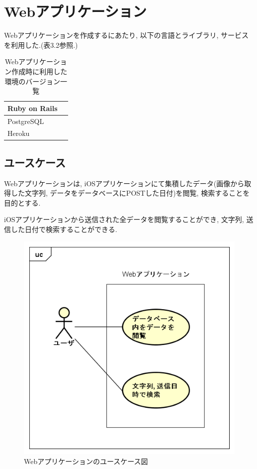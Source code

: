 \section{Webアプリケーション}
Webアプリケーションを作成するにあたり, 以下の言語とライブラリ, サービスを利用した.(表3.2参照.)

\begin{table}
\begin{center}
\begin{tabular}{|l|l|} \hline
Ruby on Rails & \\ \hline
PostgreSQL & \\ \hline
Heroku & \\ \hline
\end{tabular}
\end{center}
\caption{Webアプリケーション作成時に利用した環境のバージョン一覧}
\end{table}

\subsection{ユースケース}
Webアプリケーションは, iOSアプリケーションにて集積したデータ(画像から取得した文字列, データをデータベースにPOSTした日付)を閲覧, 検索することを目的とする.

iOSアプリケーションから送信された全データを閲覧することができ, 文字列, 送信した日付で検索することができる.
\begin{figure}
\begin{center}
\includegraphics[width=14cm]{fig/usecase_web.png}
\end{center}
\caption{Webアプリケーションのユースケース図}
\end{figure}

